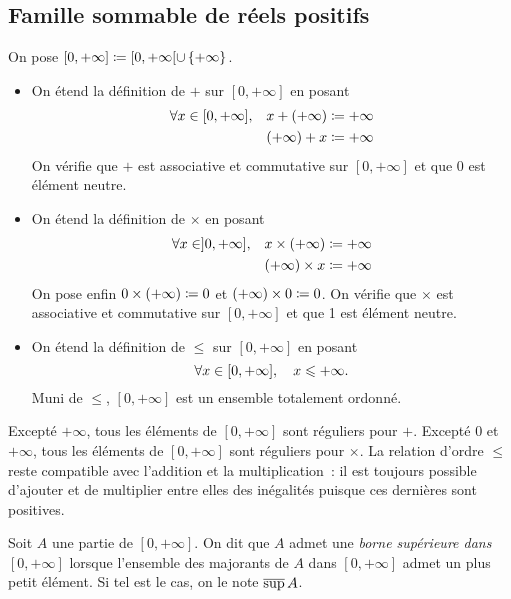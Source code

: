 \documentclass{magnolia}
\begin{document}
\subsection{Famille sommable de réels positifs}

\begin{definition}
On pose $[0,+\infty]\coloneqq [0,+\infty[\cup\left\{+\infty\right\}$.
\begin{itemize}
\item On étend la définition de $+$ sur $[0,+\infty]$ en posant
  \begin{eqnarray*}
  \forall x\in[0,+\infty],& &x + (+\infty) \coloneqq +\infty\\ 
                          & &(+\infty) + x \coloneqq +\infty
  \end{eqnarray*}
  On vérifie que $+$ est associative et commutative sur $[0,+\infty]$ et que 0 est élément
  neutre. 
\item On étend la définition de $\times$ en posant
  \begin{eqnarray*}
  \forall x\in]0,+\infty],& &x \times (+\infty) \coloneqq +\infty\\ 
                          & &(+\infty) \times x \coloneqq +\infty
  \end{eqnarray*}
  On pose enfin $0\times(+\infty)\coloneqq 0$ et $(+\infty)\times 0\coloneqq 0$. On vérifie que $\times$
  est associative et commutative sur $[0,+\infty]$ et que 1 est élément neutre. 
\item On étend la définition de $\leq$ sur $[0,+\infty]$ en posant
  \[\forall x\in[0,+\infty],\quad x\leqslant +\infty.\]
  Muni de $\leq$, $[0,+\infty]$ est un ensemble totalement ordonné.
\end{itemize}
\end{definition}

\begin{remarques}
\remarque Excepté $+\infty$, tous les éléments de $[0,+\infty]$ sont réguliers pour $+$.
  Excepté 0 et $+\infty$, tous les éléments de $[0,+\infty]$ sont réguliers pour $\times$.
\remarque La relation d'ordre $\leq$ reste compatible avec l'addition et la multiplication~:
  il est toujours possible d'ajouter et de multiplier entre elles des inégalités puisque
  ces dernières sont positives.
\end{remarques}

\begin{definition}
Soit $A$ une partie de $[0,+\infty]$. On dit que $A$ admet une \emph{borne supérieure dans
$[0,+\infty]$} lorsque l'ensemble des majorants de $A$ dans $[0,+\infty]$ admet un plus
petit élément. Si tel est le cas, on le note $\overline{\sup}\, A$.
\end{definition}
\end{document}
